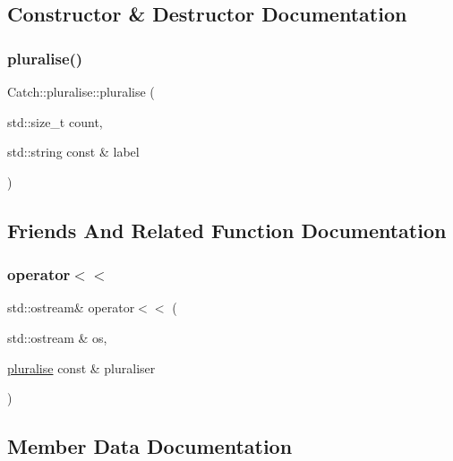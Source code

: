 \subsection{Constructor \& Destructor Documentation}
\hypertarget{struct_catch_1_1pluralise_a5c55e22de2416cfe416edf715c6b9234}{}\label{struct_catch_1_1pluralise_a5c55e22de2416cfe416edf715c6b9234} 
\subsubsection{\texorpdfstring{pluralise()}{pluralise()}}
{\footnotesize\ttfamily Catch\+::pluralise\+::pluralise (\begin{DoxyParamCaption}\item[{std\+::size\+\_\+t}]{count,  }\item[{std\+::string const \&}]{label }\end{DoxyParamCaption})}



\subsection{Friends And Related Function Documentation}
\hypertarget{struct_catch_1_1pluralise_aa7dac6b165514c1f85e0695d678fdef5}{}\label{struct_catch_1_1pluralise_aa7dac6b165514c1f85e0695d678fdef5} 
\subsubsection{\texorpdfstring{operator$<$$<$}{operator<<}}
{\footnotesize\ttfamily std\+::ostream\& operator$<$$<$ (\begin{DoxyParamCaption}\item[{std\+::ostream \&}]{os,  }\item[{\hyperlink{struct_catch_1_1pluralise}{pluralise} const \&}]{pluraliser }\end{DoxyParamCaption})\hspace{0.3cm}{\ttfamily [friend]}}



\subsection{Member Data Documentation}
\hypertarget{struct_catch_1_1pluralise_a4dce2fa13ec6f00fac09b2418265441e}{}\label{struct_catch_1_1pluralise_a4dce2fa13ec6f00fac09b2418265441e} 
